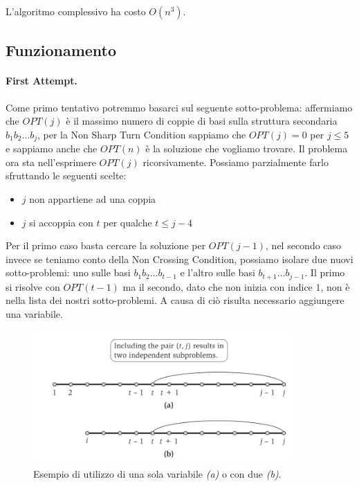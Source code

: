 L'algoritmo complessivo ha costo $O(n^3)$.

\subsection{Funzionamento}

\paragraph{First Attempt.}
Come primo tentativo potremmo basarci sul seguente sotto-problema: affermiamo che
$OPT(j)$ è il massimo numero di coppie di basi sulla struttura secondaria $b_1
    b_2 \ldots b_j$, per la Non Sharp Turn Condition sappiamo che $OPT(j) = 0$ per
$j \leq 5$ e sappiamo anche che $OPT(n)$ è la soluzione che vogliamo trovare. Il
problema ora sta nell'esprimere $OPT(j)$ ricorsivamente. Possiamo parzialmente
farlo sfruttando le seguenti scelte:

\begin{itemize}
    \item $j$ non appartiene ad una coppia
    \item $j$ si accoppia con $t$ per qualche $t \leq
              j - 4$
\end{itemize}

Per il primo caso basta cercare la soluzione per $OPT(j - 1)$, nel secondo caso
invece se teniamo conto della Non Crossing Condition, possiamo isolare due nuovi
sotto-problemi: uno sulle basi $b_1 b_2 \ldots b_{t-1}$ e l'altro sulle basi
$b_{t+1} \ldots b_{j-1}$. Il primo si risolve con $OPT(t-1)$ ma il secondo, dato
che non inizia con indice $1$, non è nella lista dei nostri sotto-problemi. A
causa di ciò risulta necessario aggiungere una variabile.

\begin{figure}[H]
    \centering
    \includegraphics[width=10cm, keepaspectratio]{capitoli/dynamic_programming/imgs/rna_funzionamento.png}
    \caption{Esempio di
        utilizzo di una sola variabile \textit{(a)} o con due \textit{(b)}.}
\end{figure}

